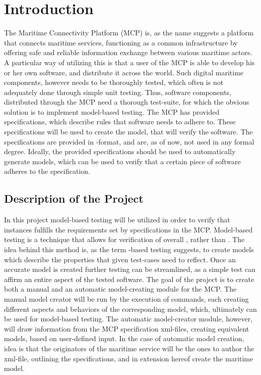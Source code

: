 \chapter{Introduction}
The Maritime Connectivity Platform \cite{mcp} (MCP) is, as the name suggests a platform that connects maritime services, functioning as a common infrastructure by offering safe and reliable information exchange between various maritime actors. A particular way of utilizing this is that a user of the MCP is able to develop his or her own software, and distribute it across the world. Such digital maritime components, however needs to be thoroughly tested, which often is not adequately done through simple unit testing. Thus, software components, distributed through the MCP need a thorough test-suite, for which the obvious solution is to implement model-based testing.
The MCP has provided specifications, which describe rules that software needs to adhere to. These specifications will be used to create the model, that will verify the software. The specifications are provided in -format, and are, as of now, not used in any formal degree. Ideally, the provided specifications should be used to automatically generate models, which can be used to verify that a certain piece of software adheres to the specification. 
\section{Description of the Project}
In this project model-based testing will be utilized in order to verify that instances fulfills the requirements set by specifications in the MCP. Model-based testing is a technique that allows for verification of overall , rather than . The idea behind this method is, as the term -based testing suggests, to create models which describe the properties that given test-cases need to reflect. 
Once an accurate model is created further testing can be streamlined, as a simple test can affirm an entire aspect of the tested software.
The goal of the project is to create both a manual and an automatic model-creating module for the MCP. The manual model creator will be run by the execution of commands, each creating different aspects and behaviors of the corresponding model, which, ultimately can be used for model-based testing. 
The automatic model-creator module, however, will draw information from the MCP specification xml-files, creating equivalent models, based on user-defined input. In the case of automatic model creation, idea is that the originators of the maritime service will be the ones to author the xml-file, outlining the specifications, and in extension hereof create the maritime model.
